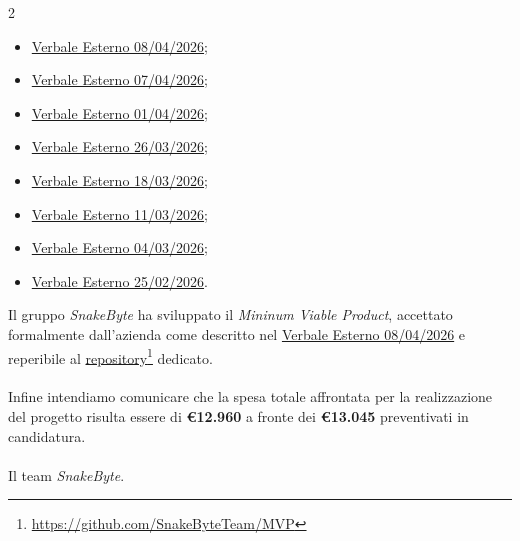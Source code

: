 \documentclass[10pt, letterpaper]{article}
\begin{document}
\begin{multicols}{2}
\begin{itemize}
        \item \href{https://snakebyteteam.github.io/3-PB/Documenti_esterni/Verbali/ve_2026_04_08/ve_2026_04_08.pdf}{Verbale Esterno 08/04/2026};
        \item \href{https://snakebyteteam.github.io/3-PB/Documenti_esterni/Verbali/ve_2026_04_07/ve_2026_04_07.pdf}{Verbale Esterno 07/04/2026};
        \item \href{https://snakebyteteam.github.io/3-PB/Documenti_esterni/Verbali/ve_2026_04_01/ve_2026_04_01.pdf}{Verbale Esterno 01/04/2026};
        \item \href{https://snakebyteteam.github.io/3-PB/Documenti_esterni/Verbali/ve_2026_03_26/ve_2026_03_26.pdf}{Verbale Esterno 26/03/2026};
        \item \href{https://snakebyteteam.github.io/3-PB/Documenti_esterni/Verbali/ve_2026_03_18/ve_2026_03_18.pdf}{Verbale Esterno 18/03/2026};
        \item \href{https://snakebyteteam.github.io/3-PB/Documenti_esterni/Verbali/ve_2026_03_11/ve_2026_03_11.pdf}{Verbale Esterno 11/03/2026};
        \item \href{https://snakebyteteam.github.io/3-PB/Documenti_esterni/Verbali/ve_2026_03_04/ve_2026_03_04.pdf}{Verbale Esterno 04/03/2026};
        \item \href{https://snakebyteteam.github.io/3-PB/Documenti_esterni/Verbali/ve_2026_02_25/ve_2026_02_25.pdf}{Verbale Esterno 25/02/2026}.
    \end{itemize}
\end{multicols}
\bigskip
\noindent Il gruppo \textit{SnakeByte} ha sviluppato il \textit{Mininum Viable Product}, 
accettato formalmente dall'azienda come descritto nel \href{https://snakebyteteam.github.io/3-PB/Documenti_esterni/Verbali/ve_2026_04_08/ve_2026_04_08.pdf}{Verbale Esterno 08/04/2026} e
reperibile al 
\href{https://github.com/SnakeByteTeam/MVP}{repository}\footnote{\href{https://github.com/SnakeByteTeam/MVP}{https://github.com/SnakeByteTeam/MVP}} dedicato.\\
\\
Infine intendiamo comunicare che la spesa totale affrontata per la realizzazione del progetto risulta essere di \textbf{\euro 12.960} a fronte dei
\textbf{\euro 13.045} preventivati in candidatura.
\\\\Il team \textit{SnakeByte}.
\end{document}
